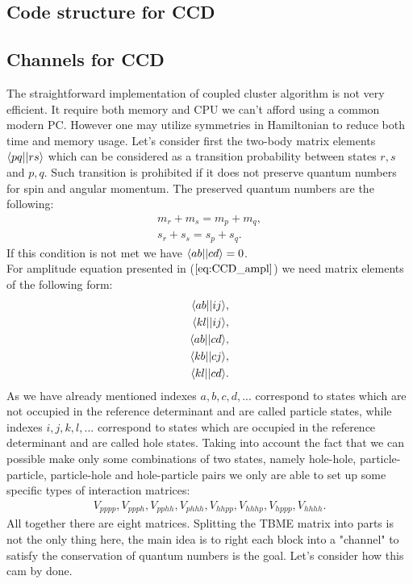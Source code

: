 \documentclass[twoside,english]{uiofysmaster}
\theoremstyle{definition}
\begin{document}
\subsection{Code structure for CCD}

\subsection{Channels for CCD}
The straightforward implementation of coupled cluster algorithm is not very efficient. It require both memory and CPU we can't afford using a common modern PC. However one may utilize symmetries in Hamiltonian to reduce both time and memory usage. Let's consider first the two-body matrix elements $\braket{pq||rs}$ which can be considered as a transition probability between states $r,s$ and $p,q$. Such transition is prohibited if it does not preserve quantum numbers for spin and angular momentum. The preserved quantum numbers are the following:
\begin{align}
m_r + m_s = m_p + m_q,\\
s_r + s_s = s_p + s_q.
\end{align}
If this condition is not met we have $\braket{ab||cd} = 0$.\\
For amplitude equation presented in ($\ref{eq:CCD_ampl}$) we need matrix elements of the following form:
\begin{align}\label{eq:TBME_channels}
\braket{ab||ij}&,\\
\braket{kl||ij}&,\\
\braket{ab||cd}&,\\
\braket{kb||cj}&,\\
\braket{kl||cd}&.\\
\end{align}
As we have already mentioned indexes $a,b,c,d,...$ correspond to states which are not occupied in the reference determinant and are called particle states, while  indexes $i,j,k,l,...$ correspond to states which are occupied in the reference determinant and are called hole states. Taking into account the fact that we can possible make only some combinations of two states, namely hole-hole, particle-particle, particle-hole and hole-particle pairs we only are able to set up some  specific types of interaction matrices:
\begin{align}
V_{pppp},V_{ppph}, V_{pphh}, V_{phhh},V_{hhpp},V_{hhhp},V_{hppp},V_{hhhh}.
\end{align}
All together there are eight matrices. Splitting the TBME matrix into parts is not the only thing here, the main idea is to right each block into a "channel" to satisfy the conservation of quantum numbers is the goal. Let's consider how this cam by done.\\
\end{document}
